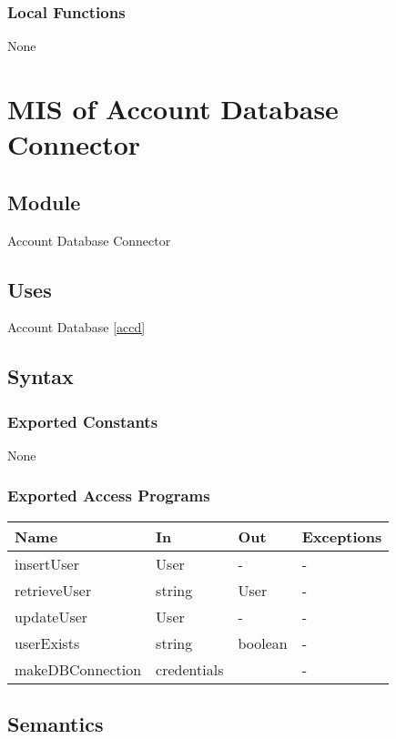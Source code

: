 \documentclass[12pt, titlepage]{article}
\begin{document}
\subsubsection{Local Functions}
None

\section{MIS of Account Database Connector} \label{accdc}

\subsection{Module}

Account Database Connector

\subsection{Uses}

Account Database \ref{accd}

\subsection{Syntax}

\subsubsection{Exported Constants}
None
\subsubsection{Exported Access Programs}

\begin{center}
\begin{tabular}{p{2cm} p{4cm} p{4cm} p{2cm}}
\hline
\textbf{Name} & \textbf{In} & \textbf{Out} & \textbf{Exceptions} \\
\hline
insertUser & User & - & - \\
retrieveUser & string & User & - \\
updateUser & User & - & - \\
userExists & string & boolean & - \\
makeDBConnection & credentials & & - \\
\hline
\end{tabular}
\end{center}

\subsection{Semantics}
\end{document}
